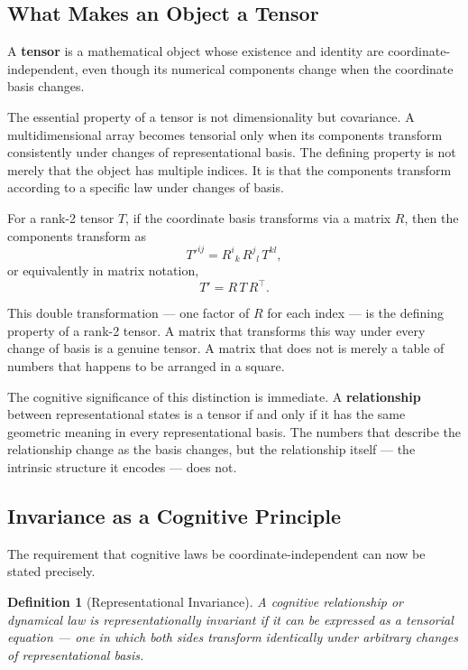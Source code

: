 \documentclass[12pt,a4paper]{article}
\newtheorem{definition}{Definition}[section]
\begin{document}
\subsection{What Makes an Object a Tensor}

A \textbf{tensor} is a mathematical object whose existence and identity are coordinate-independent, even though its numerical components change when the coordinate basis changes.

The essential property of a tensor is not dimensionality but covariance. A multidimensional array becomes tensorial only when its components transform consistently under changes of representational basis. The defining property is not merely that the object has multiple indices. It is that the components transform according to a specific law under changes of basis.

For a rank-2 tensor $T$, if the coordinate basis transforms via a matrix $R$, then the components transform as
\[
T'^{ij} = R^i{}_k \, R^j{}_l \, T^{kl},
\]
or equivalently in matrix notation,
\[
T' = R \, T \, R^\top.
\]

This double transformation --- one factor of $R$ for each index --- is the defining property of a rank-2 tensor. A matrix that transforms this way under every change of basis is a genuine tensor. A matrix that does not is merely a table of numbers that happens to be arranged in a square.

The cognitive significance of this distinction is immediate. A \textbf{relationship} between representational states is a tensor if and only if it has the same geometric meaning in every representational basis. The numbers that describe the relationship change as the basis changes, but the relationship itself --- the intrinsic structure it encodes --- does not.

\subsection{Invariance as a Cognitive Principle}

The requirement that cognitive laws be coordinate-independent can now be stated precisely.

\begin{definition}[Representational Invariance]
A cognitive relationship or dynamical law is representationally invariant if it can be expressed as a tensorial equation --- one in which both sides transform identically under arbitrary changes of representational basis.
\end{definition}
\end{document}
